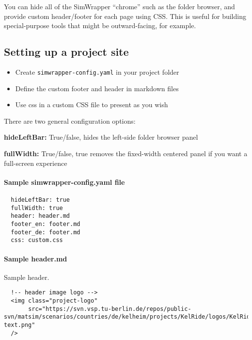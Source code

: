 You can hide all of the SimWrapper ``chrome'' such as the folder
browser, and provide custom header/footer for each page using CSS. This
is useful for building special-purpose tools that might be
outward-facing, for example.

\hypertarget{setting-up-a-project-site}{%
\subsection{Setting up a project site}\label{setting-up-a-project-site}}

\begin{itemize}
\tightlist
\item
  Create \texttt{simwrapper-config.yaml} in your project folder
\item
  Define the custom footer and header in markdown files
\item
  Use css in a custom CSS file to present as you wish
\end{itemize}

There are two general configuration options:

\textbf{hideLeftBar:} True/false, hides the left-side folder browser
panel

\textbf{fullWidth:} True/false, true removes the fixed-width centered
panel if you want a full-screen experience

\hypertarget{sample-simwrapper-config.yaml-file}{%
\paragraph{Sample simwrapper-config.yaml
file}\label{sample-simwrapper-config.yaml-file}}

\begin{lstlisting}
  hideLeftBar: true
  fullWidth: true
  header: header.md
  footer_en: footer.md
  footer_de: footer.md
  css: custom.css
\end{lstlisting}

\paragraph{Sample header.md}
Sample header.

\begin{lstlisting}
  !-- header image logo -->
  <img class="project-logo"
       src="https://svn.vsp.tu-berlin.de/repos/public-svn/matsim/scenarios/countries/de/kelheim/projects/KelRide/logos/KelRide-text.png"
  />
\end{lstlisting}

